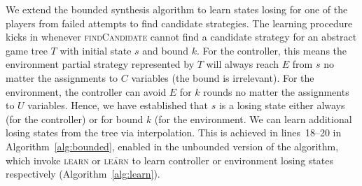 \documentclass{llncs}
\newcommand{\textoverline}[1]{$\overline{\mbox{#1}}$}
\begin{document}
We extend the bounded synthesis algorithm to learn states losing for one of the
players from failed attempts to find candidate strategies.  The learning
procedure kicks in whenever \textsc{findCandidate} cannot find a candidate
strategy for an abstract game tree $T$ with initial state $s$ and bound $k$.
For the controller, this means the environment partial strategy represented by $T$
will always reach $E$ from $s$ no matter the assignments to $C$ variables (the
bound is irrelevant).  For the environment, the controller can avoid $E$ for $k$
rounds no matter the assignments to $U$ variables. Hence, we have established
that $s$ is a losing state either always (for the controller) or for bound $k$ (for
the environment. We can learn additional losing states from the tree via
interpolation.  This is achieved in lines~18--20 in
Algorithm~\ref{alg:bounded}, enabled in the unbounded version of the algorithm,
which invoke \textsc{learn} or \textsc{\textoverline{learn}} to learn
controller or environment losing states respectively
(Algorithm~\ref{alg:learn}).
\end{document}
